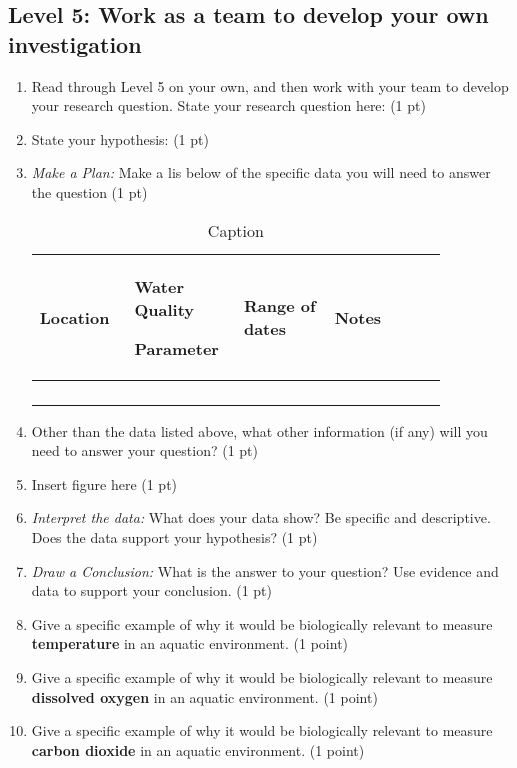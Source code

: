 \documentclass[12pt,a4paper]{article}
\begin{document}
\subsection*{Level 5: Work as a team to develop your own investigation}
\begin{enumerate}[font=\bfseries, wide, resume]
    \item Read through Level 5 on your own, and then work with your team to develop your research question. State your research question here: (1 pt)
    \item State your hypothesis: (1 pt)
    \item \textit{Make a Plan:} Make a lis below of the specific data you will need to answer the question (1 pt) \par
    \begin{table}[ht]
        \centering
        \caption[]{Caption}
        \begin{tabular}{m{0.2\linewidth}m{0.2\linewidth}m{0.2\linewidth}m{0.25\linewidth}}
            \toprule
            Location & Water Quality \par Parameter & Range of dates & Notes \\
            \midrule
             & & & \\
             & & & \\
             & & & \\
             & & & \\
            \bottomrule
            \end{tabular}
    \end{table}
    \item Other than the data listed above, what other information (if any) will you need to answer your question? (1 pt)
    \item Insert figure here (1 pt)
    \item \textit{Interpret the data:} What does your data show? Be specific and descriptive. Does the data support your hypothesis? (1 pt)
    \item \textit{Draw a Conclusion:} What is the answer to your question? Use evidence and data to support your conclusion. (1 pt)
    \item Give a specific example of why it would be biologically relevant to measure \textbf{temperature} in an aquatic environment. (1 point)
    \item Give a specific example of why it would be biologically relevant to measure \textbf{dissolved oxygen} in an aquatic environment. (1 point)
    \item Give a specific example of why it would be biologically relevant to measure \textbf{carbon dioxide} in an aquatic environment. (1 point)
\end{enumerate}
\end{document}
